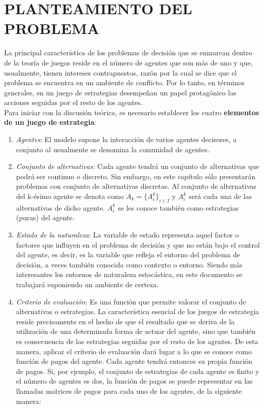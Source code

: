 \section{PLANTEAMIENTO DEL PROBLEMA}\label{Sec:Planteamiento}
La principal característica de los problemas de decisión que se enmarcan dentro de la teoría de juegos reside en el número  de agentes que son más de uno y que, usualmente, tienen intereses contrapuestos, razón por la cual se dice que el problema se encuentra en un ambiente de conflicto. Por lo tanto, en términos generales, en un juego de estrategias desempeñan un papel protagónico las acciones seguidas por el resto de los agentes.\\

Para iniciar con la discusión teórica, es necesario establecer los cuatro  \textbf{elementos de un juego de estrategia}:\\

\begin{enumerate}

\item \textit{Agentes}: El modelo supone la interacción de varios agentes decisores, a conjunto al  usualmente se denomina la comunidad de agentes.

\item \textit{Conjunto de alternativas}: Cada agente tendrá un conjunto de alternativas que podrá ser continuo o discreto.  Sin embargo, en este capítulo sólo presentarán problemas con conjunto de alternativas discretas. Al conjunto de alternativas del k-ésimo agente se denota como $A_k={\lbrace A^k_i \rbrace}_{i \in I} $ y $A^k_i$ será cada una de las alternativas de dicho agente. $A^k_i$ se les conoce también como estrategias (puras) del agente.

\item \textit{Estado de la naturaleza}: La variable de estado representa aquel factor o factores que influyen en el problema de decisión y que no están bajo el control del agente, es decir, es la variable que refleja el entorno del problema de decisión, a veces también conocida como contexto o entorno. Siendo más interesantes los entornos de naturaleza estocástica, en este documento se trabajará suponiendo un ambiente de certeza.

\item \textit{Criterio de evaluación}: Es una función que permite valorar el conjunto de alternativas o estrategias. La característica  esencial de los juegos de estrategia  reside precisamente en el hecho de  que el resultado que se deriva de la utilización de una determinada forma de actuar del agente, sino que también es consecuencia de las estrategias seguidas por el resto de los agentes. De esta manera, aplicar el criterio de  evaluación  dará lugar a lo que se conoce como función de pagos del agente. Cada agente tendrá entonces su propia función de pagos. Si, por ejemplo, el conjunto de estrategias de cada agente es finito y el número de agentes es dos, la función de pagos se puede representar en las llamadas matrices de pagos para cada uno de los agentes, de la siguiente manera:
\end{enumerate}


